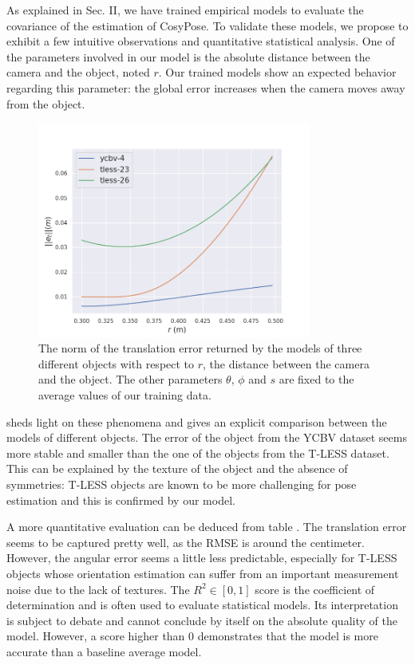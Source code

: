 As explained in Sec. II, we have trained empirical models to evaluate the covariance of the estimation of CosyPose. 
To validate these models, we propose to exhibit a few intuitive observations and quantitative statistical analysis. 
One of the parameters involved in our model is the absolute distance between the camera and the object, noted $r$. 
Our trained models show an expected behavior regarding this parameter: the global error increases when the camera moves away from the object. 
%
\begin{figure}[h]
  \centering 
  \includegraphics[width=0.8\textwidth]{figures/cosyslam/empirical_err.png}
  \caption{The norm of the translation error returned by the models of three different objects with respect to $r$, the distance between the camera and the object. 
            The other parameters $\theta$, $\phi$ and $s$ are fixed to the average values of our training data. }
  \label{fig:empirical_err}
\end{figure}

 sheds light on these phenomena and gives an explicit comparison between the models of different objects. 
The error of the object from the YCBV dataset seems more stable and smaller than the one of the objects from the T-LESS dataset. 
This can be explained by the texture of the object and the absence of symmetries: T-LESS objects are known to be more challenging 
for pose estimation and this is confirmed by our model.

A more quantitative evaluation can be deduced from table . The translation error seems to be captured pretty well,
 as the RMSE is around the centimeter. However, the angular error seems a little less predictable, especially for T-LESS objects whose orientation 
 estimation can suffer from an important measurement noise due to the lack of textures. The $R^2\in[0,1]$ score is the coefficient of determination 
 and is often used to evaluate statistical models. Its interpretation is subject to debate and cannot conclude by itself on the absolute quality of the model. 
 However, a score higher than 0 demonstrates that the model is more accurate than a baseline average model.

